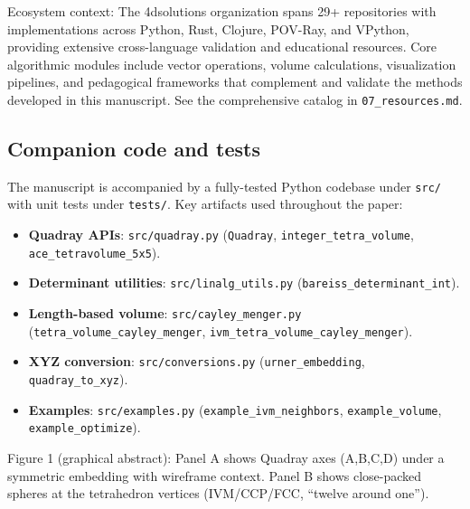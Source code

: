 \documentclass[
  10pt,
]{article}
\providecommand{\tightlist}{%
  \setlength{\itemsep}{0pt}\setlength{\parskip}{0pt}}
\begin{document}
Ecosystem context: The 4dsolutions organization spans 29+ repositories
with implementations across Python, Rust, Clojure, POV-Ray, and VPython,
providing extensive cross-language validation and educational resources.
Core algorithmic modules include vector operations, volume calculations,
visualization pipelines, and pedagogical frameworks that complement and
validate the methods developed in this manuscript. See the comprehensive
catalog in \texttt{07\_resources.md}.

\hypertarget{companion-code-and-tests}{%
\subsection{Companion code and tests}\label{companion-code-and-tests}}

The manuscript is accompanied by a fully-tested Python codebase under
\texttt{src/} with unit tests under \texttt{tests/}. Key artifacts used
throughout the paper:

\begin{itemize}
\tightlist
\item
  \textbf{Quadray APIs}: \texttt{src/quadray.py} (\texttt{Quadray},
  \texttt{integer\_tetra\_volume}, \texttt{ace\_tetravolume\_5x5}).
\item
  \textbf{Determinant utilities}: \texttt{src/linalg\_utils.py}
  (\texttt{bareiss\_determinant\_int}).
\item
  \textbf{Length-based volume}: \texttt{src/cayley\_menger.py}
  (\texttt{tetra\_volume\_cayley\_menger},
  \texttt{ivm\_tetra\_volume\_cayley\_menger}).
\item
  \textbf{XYZ conversion}: \texttt{src/conversions.py}
  (\texttt{urner\_embedding}, \texttt{quadray\_to\_xyz}).
\item
  \textbf{Examples}: \texttt{src/examples.py}
  (\texttt{example\_ivm\_neighbors}, \texttt{example\_volume},
  \texttt{example\_optimize}).
\end{itemize}

Figure 1 (graphical abstract): Panel A shows Quadray axes (A,B,C,D)
under a symmetric embedding with wireframe context. Panel B shows
close-packed spheres at the tetrahedron vertices (IVM/CCP/FCC, ``twelve
around one'').
\end{document}
